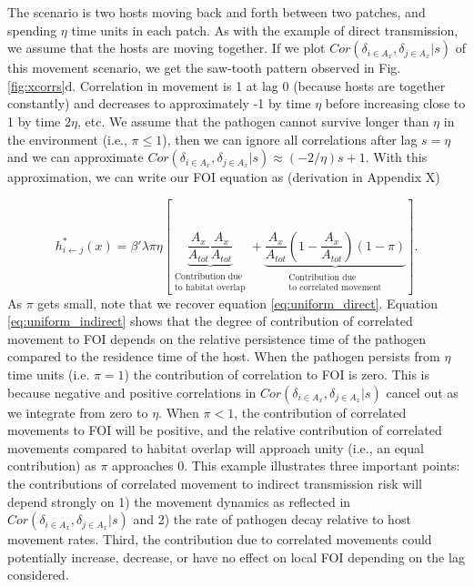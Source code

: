 \documentclass[letterpaper]{article}
\begin{document}
The scenario is two hosts moving back and forth between two patches, and spending $\eta$ time units in each patch.  As with the example of direct transmission, we assume that the hosts are moving together. If we plot $Cor(\delta_{i \in A_x}, \delta_{j \in A_x} | s)$ of this movement scenario, we get the saw-tooth pattern observed in Fig. \ref{fig:xcorrs}d.  
Correlation in movement is 1 at lag 0 (because hosts are together constantly) and decreases to approximately -1 by time $\eta$ before increasing close to 1 by time $2\eta$, etc. 
We assume that the pathogen cannot survive longer than $\eta$ in the environment (i.e., $\pi \leq 1$), then we can ignore all correlations after lag $s = \eta$ and we can approximate $Cor(\delta_{i \in A_x}, \delta_{j \in A_x} | s) \approx (-2 / \eta)s + 1$.  With this approximation, we can write our FOI equation as (derivation in Appendix X)


\begin{equation}
    h^*_{i \leftarrow j}(x) = \beta' \lambda \pi \eta \left[ \underbrace{\frac{A_x}{A_{tot}}\frac{A_x}{A_{tot}}}_{\substack{\text{Contribution due} \\ \text{to habitat overlap}}} + \underbrace{\frac{A_x}{A_{tot}}(1 - \frac{A_x}{A_{tot}}) (1 - \pi)}_{\substack{\text{Contribution due} \\ \text{to correlated movement}}} \right].
    \label{eq:uniform_indirect}
\end{equation}
As $\pi$ gets small, note that we recover equation \ref{eq:uniform_direct}.  Equation \ref{eq:uniform_indirect} shows that the degree of contribution of correlated movement to FOI depends on the relative persistence time of the pathogen compared to the residence time of the host.  
When the pathogen persists from $\eta$ time units (i.e. $\pi = 1$) the contribution of correlation to FOI is zero.  This is because negative and positive correlations in $Cor(\delta_{i \in A_x}, \delta_{j \in A_x} | s)$ cancel out as we integrate from zero to $\eta$.  
When $\pi < 1$, the contribution of correlated movements to FOI will be positive, and the relative contribution of correlated movements compared to habitat overlap will approach unity (i.e., an equal contribution) as $\pi$ approaches 0. 
This example illustrates three important points: the contributions of correlated movement to indirect transmission risk will depend strongly on 1) the movement dynamics as reflected in $Cor(\delta_{i \in A_x}, \delta_{j \in A_x} | s)$ and 2) the rate of pathogen decay relative to host movement rates.  Third, the contribution due to correlated movements could potentially increase, decrease, or have no effect on local FOI depending on the lag considered.  



\end{document}
